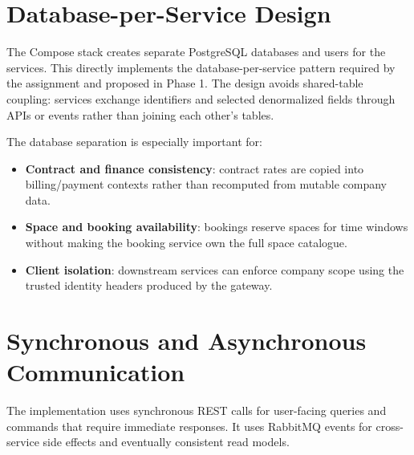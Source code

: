 \documentclass[12pt,a4paper]{report}
\begin{document}
\section{Database-per-Service Design}
\label{sec:database-per-service}

The Compose stack creates separate PostgreSQL databases and users for the
services. This directly implements the database-per-service pattern required by
the assignment and proposed in Phase 1. The design avoids shared-table coupling:
services exchange identifiers and selected denormalized fields through APIs or
events rather than joining each other's tables.

The database separation is especially important for:
\begin{itemize}
  \item \textbf{Contract and finance consistency}: contract rates are copied into
  billing/payment contexts rather than recomputed from mutable company data.
  \item \textbf{Space and booking availability}: bookings reserve spaces for time
  windows without making the booking service own the full space catalogue.
  \item \textbf{Client isolation}: downstream services can enforce company scope
  using the trusted identity headers produced by the gateway.
\end{itemize}

\section{Synchronous and Asynchronous Communication}
\label{sec:communication}

The implementation uses synchronous REST calls for user-facing queries and
commands that require immediate responses. It uses RabbitMQ events for
cross-service side effects and eventually consistent read models.
\end{document}
